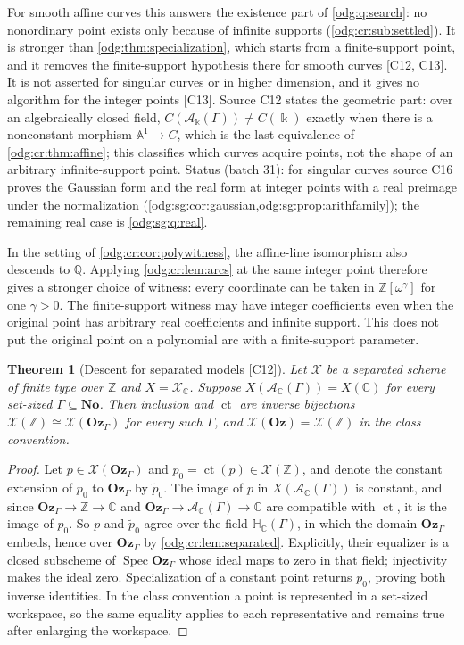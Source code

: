 \documentclass[11pt,oneside]{article}
\numberwithin{equation}{section}
\newtheorem{theorem}{Theorem}[section]
\theoremstyle{definition}
\theoremstyle{remark}
\newcommand{\No}{\mathbf{No}}
\newcommand{\Oz}{\mathbf{Oz}}
\newcommand{\Z}{\mathbb Z}
\newcommand{\Q}{\mathbb Q}
\newcommand{\C}{\mathbb C}
\newcommand{\ct}{\operatorname{ct}}
\newcommand{\src}[1]{\textup{\textsf{\small[#1]}}}
\newcommand{\crA}{\mathcal A_\Bbbk(\Gamma)}
\newcommand{\Aff}{\mathbb A}
\newcommand{\Spec}{\operatorname{Spec}}
\begin{document}
For smooth affine curves this answers the existence part of \cref{odg:q:search}:
no nonordinary point exists only because of infinite supports
(\cref{odg:cr:sub:settled}). It is stronger than \cref{odg:thm:specialization},
which starts from a finite-support point, and it removes the finite-support
hypothesis there for smooth curves \src{C12, C13}. It is not asserted for singular
curves or in higher dimension, and it gives no algorithm for the integer points
\src{C13}. Source C12 states the geometric part: over an algebraically closed
field, $C(\crA)\ne C(\Bbbk)$ exactly when there is a nonconstant morphism
$\Aff^1\to C$, which is the last equivalence of \cref{odg:cr:thm:affine}; this
classifies which curves acquire points, not the shape of an arbitrary
infinite-support point. Status (batch 31): for singular curves source C16 proves the Gaussian form
and the real form at integer points with a real preimage under the normalization
(\cref{odg:sg:cor:gaussian,odg:sg:prop:arithfamily}); the remaining real case is
\cref{odg:sg:q:real}.

In the setting of \cref{odg:cr:cor:polywitness}, the affine-line isomorphism
also descends to $\Q$. Applying \cref{odg:cr:lem:arcs} at the same integer point
therefore gives a stronger choice of witness: every coordinate can be taken in
$\Z[\omega^\gamma]$ for one $\gamma>0$. The finite-support witness may have
integer coefficients even when the original point has arbitrary real
coefficients and infinite support. This does not put the original point on a
polynomial arc with a finite-support parameter.

\begin{theorem}[Descent for separated models \src{C12}]\label{odg:cr:thm:descent}
Let $\mathcal X$ be a separated scheme of finite type over $\Z$ and
$X=\mathcal X_\C$. Suppose $X(\mathcal A_\C(\Gamma))=X(\C)$ for every set-sized
$\Gamma\subseteq\No$. Then inclusion and $\ct$ are inverse bijections
$\mathcal X(\Z)\cong\mathcal X(\Oz_\Gamma)$ for every such $\Gamma$, and
$\mathcal X(\Oz)=\mathcal X(\Z)$ in the class convention.
\end{theorem}
\begin{proof}
Let $p\in\mathcal X(\Oz_\Gamma)$ and $p_0=\ct(p)\in\mathcal X(\Z)$, and denote
the constant extension of $p_0$ to $\Oz_\Gamma$ by $\widetilde p_0$.
The image of $p$
in $X(\mathcal A_\C(\Gamma))$ is constant, and since
$\Oz_\Gamma\to\Z\to\C$ and $\Oz_\Gamma\to\mathcal A_\C(\Gamma)\to\C$ are compatible
with $\ct$, it is the image of $p_0$. So $p$ and $\widetilde p_0$ agree over the field
$\mathbb H_\C(\Gamma)$, in which the domain $\Oz_\Gamma$ embeds, hence over
$\Oz_\Gamma$ by \cref{odg:cr:lem:separated}. Explicitly, their equalizer is
a closed subscheme of $\Spec\Oz_\Gamma$ whose ideal maps to zero in that
field; injectivity makes the ideal zero. Specialization of a constant point
returns $p_0$, proving both inverse identities. In the class convention a
point is represented in a set-sized workspace, so the same equality applies
to each representative and remains true after enlarging the workspace.
\end{proof}
\end{document}
